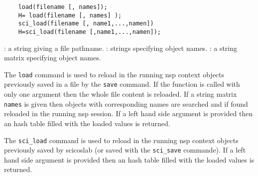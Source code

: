 \begin{mandesc}
\end{mandesc}

\begin{calling_sequence}
  \begin{verbatim}
    load(filename [, names]);
    H= load(filename [, names] );
    sci_load(filename [, name1,...,namen])  
    H=sci_load(filename [,name1,...,namen]);
  \end{verbatim}
\end{calling_sequence}
\begin{parameters}
  \begin{varlist}
    : a string giving a file pathname.
    : strings specifying object names. 
    : a string matrix specifying object names. 
  \end{varlist}
\end{parameters}
\begin{mandescription}
  The \verb!load! command is used to reload in the running nsp context 
  objects previously saved in a file by the \verb!save! command. 
  If the function is called with only one argument then the 
  whole file content is reloaded. If a string matrix \verb!names! is given then 
  objects with corresponding names are searched and if found reloaded in 
  the running nsp session. 
  If a left hand side argument is provided then an hash table 
  filled with the loaded values is returned.
  
  The \verb!sci_load! command is used to reload in the running nsp context
  objects previously saved by scicoslab (or saved with the  \verb!sci_save! 
  commande). If a left hand side argument is provided then an hash table 
  filled with the loaded values is returned.
\end{mandescription}
\begin{examples}
  \begin{program}
  \end{program}
\end{examples}
\begin{manseealso}
\end{manseealso}

